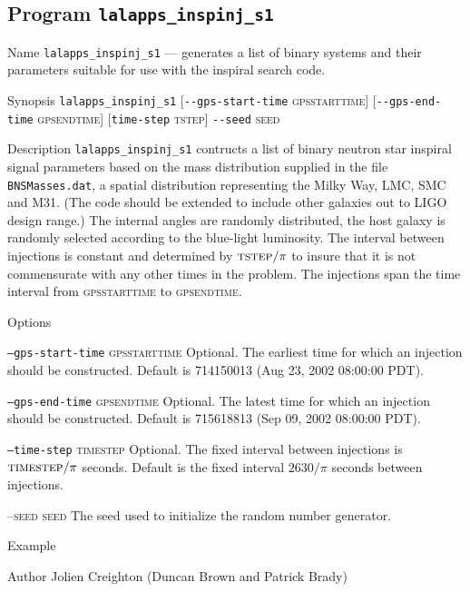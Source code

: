 \clearpage
\subsection{Program \texttt{lalapps\_inspinj\_s1}}
\label{program:lalapps-inspinj-s1}

\begin{entry}
\item[Name]
\verb$lalapps_inspinj_s1$ --- generates a list of binary systems and
their parameters suitable for use with the inspiral search code.

\item[Synopsis]
\verb$lalapps_inspinj_s1$ 
[\verb$--gps-start-time$ \textsc{gpsstarttime}] 
[\verb$--gps-end-time$ \textsc{gpsendtime}] 
[\verb$time-step$ \textsc{tstep}] 
\verb$--seed$ \textsc{seed}

\item[Description] 
\verb$lalapps_inspinj_s1$ contructs a list of binary neutron star
inspiral signal parameters based on the mass distribution supplied in
the file \texttt{BNSMasses.dat},  a spatial distribution representing
the Milky Way,  LMC,  SMC and M31.   (The code should be extended to
include other galaxies out to LIGO design range.)   The internal
angles are randomly distributed,  the host galaxy is randomly selected
according to the blue-light luminosity.   The interval between
injections is constant and determined by $\textsc{tstep}/\pi$ to
insure that it is not commensurate with any other times in the
problem.   The injections span the time interval from \textsc{gpsstarttime} 
to \textsc{gpsendtime}.

\item[Options]\leavevmode
\begin{entry}
\item[\texttt{--gps-start-time} \textsc{gpsstarttime}] Optional.  The earliest
time for which an injection should be constructed.   Default is 
714150013 (Aug 23, 2002  08:00:00 PDT).

\item[\texttt{--gps-end-time} \textsc{gpsendtime}] Optional. The latest
time for which an injection should be constructed.  Default is
715618813 (Sep 09, 2002  08:00:00 PDT).

\item[\texttt{--time-step} \textsc{timestep}] Optional. The fixed interval
between injections is $\textsc{timestep}/\pi$ seconds.   Default is the fixed
interval $2630 / \pi$ seconds between injections.

\item[\textsc{--seed} \textsc{seed}] The seed used to initialize the
random number generator.
\end{entry}

\item[Example]

\item[Author] 
Jolien Creighton (Duncan Brown and Patrick Brady)
\end{entry}
\clearpage

